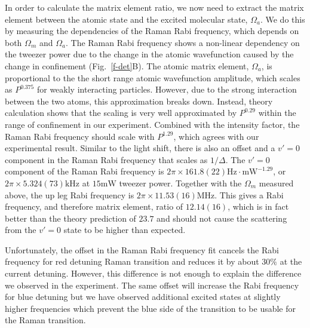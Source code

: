 \documentclass[aps,prl,twocolumn,superscriptaddress]{revtex4-1}
\begin{document}
In order to calculate the matrix element ratio, we now need to extract the matrix element between the atomic state and the excited molecular state, $ \Omega_a $. We do this by measuring the dependencies of the Raman Rabi frequency, which depends on both $\Omega_m$ and $\Omega_a$.
The Raman Rabi frequency shows a non-linear dependency on the tweezer power due to the change
in the atomic wavefunction caused by the change in confinement (Fig.~\ref{f-det}B).
The atomic matrix element, $\Omega_a$,
is proportional to the the short range atomic wavefunction amplitude,
which scales as $P^{0.375}$ for weakly interacting particles.
However, due to the strong interaction between the two atoms, this approximation breaks down.
Instead, theory calculation shows that the scaling is very well approximated by $P^{0.29}$
within the range of confinement in our experiment.
Combined with the intensity factor, the Raman Rabi frequency should scale with $P^{1.29}$,
which agrees with our experimental result.
Similar to the light shift, there is also an offset and
a $v'=0$ component in the Raman Rabi frequency that scales as $1/\Delta$.
The $v'=0$ component of the Raman Rabi frequency is
$2\pi\times161.8(22) \mathrm{Hz\cdot mW^{-1.29}}$,
or $2\pi \times 5.324(73)\mathrm{kHz}$ at $15 \mathrm{mW}$ tweezer power.
Together with the $\Omega_m$ measured above, the up leg Rabi frequency is
$2\pi \times 11.53(16)\mathrm{MHz}$.
This gives a Rabi frequency, and therefore matrix element, ratio of $12.14(16)$,
which is in fact better than the theory prediction of $23.7$
and should not cause the scattering from the $v'=0$ state to be higher than expected.

Unfortunately, the offset in the Raman Rabi frequency fit cancels
the Rabi frequency for red detuning Raman transition and reduces it by about $30\%$
at the current detuning. However, this difference is not enough to explain
the difference we observed in the experiment.
The same offset will increase the Rabi frequency for blue detuning
but we have observed additional excited states at slightly higher frequencies
which prevent the blue side of the transition to be usable for the Raman transition.
\end{document}
